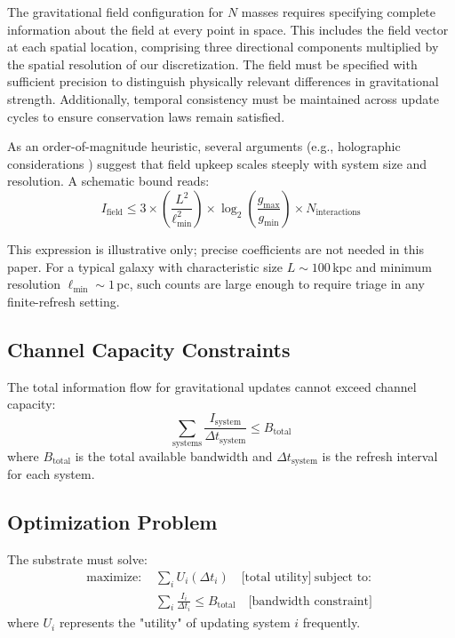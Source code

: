 \documentclass[usenatbib]{mnras}
\begin{document}
The gravitational field configuration for $N$ masses requires specifying complete information about the field at every point in space. This includes the field vector at each spatial location, comprising three directional components multiplied by the spatial resolution of our discretization. The field must be specified with sufficient precision to distinguish physically relevant differences in gravitational strength. Additionally, temporal consistency must be maintained across update cycles to ensure conservation laws remain satisfied.

As an order-of-magnitude heuristic, several arguments (e.g., holographic considerations \citep{Bekenstein1973, tHooft1993}) suggest that field upkeep scales steeply with system size and resolution. A schematic bound reads:
\begin{equation}
I_{\text{field}} \leq 3 \times \left(\frac{L^2}{\ell_{\text{min}}^2}\right) \times \log_2\left(\frac{g_{\text{max}}}{g_{\text{min}}}\right) \times N_{\text{interactions}}
\end{equation}

This expression is illustrative only; precise coefficients are not needed in this paper. For a typical galaxy with characteristic size $L \sim 100$\,kpc and minimum resolution $\ell_{\text{min}} \sim 1$\,pc, such counts are large enough to require triage in any finite-refresh setting.

\subsection{Channel Capacity Constraints}

The total information flow for gravitational updates cannot exceed channel capacity:
\begin{equation}
\sum_{\text{systems}} \frac{I_{\text{system}}}{\Delta t_{\text{system}}} \leq B_{\text{total}}
\end{equation}
where $B_{\text{total}}$ is the total available bandwidth and $\Delta t_{\text{system}}$ is the refresh interval for each system.

\subsection{Optimization Problem}

The substrate must solve:
\begin{align}
\text{maximize: } & \sum_i U_i(\Delta t_i) \quad \text{[total utility]} \
\text{subject to: }\\ & \sum_i \frac{I_i}{\Delta t_i} \leq B_{\text{total}} \quad \text{[bandwidth constraint]}
\end{align}
where $U_i$ represents the "utility" of updating system $i$ frequently.
\end{document}
